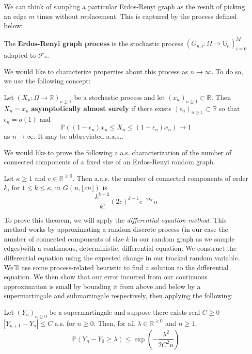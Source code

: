 We can think of sampling a particular Erdos-Renyi graph as the result of picking an edge \(m\) times without replacement. This is captured by the process defined below:
\begin{definition}
    The \textbf{Erdos-Renyi graph process} is the stochastic process \((G_{n, i}: \Omega \to \mathbb{G}_{n})_{i=0}^{M}\) adapted to \(\mathcal{F}_{*}\).
\end{definition}

We would like to characterize properties about this process as \(n \to \infty\). To do so, we use the following concept:
\begin{definition}
     Let \((X_{n}: \Omega \to \mathbb{R})_{n \geq 1}\) be a stochastic process and let \((x_{n})_{n \geq 1}\subset \mathbb{R}\). Then \(X_{n} = x_{n}\) \textbf{asymptotically almost surely} if there exists \((\epsilon_{n})_{n \geq 1} \subset \mathbb{R}\) so that \(\epsilon_{n} = o(1)\) and
    \[\mathbb{P}((1 - \epsilon_{n})x_{n} \leq X_{n} \leq (1 + \epsilon_{n})x_{n}) \to 1\]
    as \(n \to \infty\). It may be abbreviated a.a.s..
\end{definition}

We would like to prove the following a.a.s. characterization of the number of connected components of a fixed size of an Erdos-Renyi random graph.

\begin{theorem}
    Let \(\kappa \geq 1\) and \(c \in \mathbb{R}^{\geq 0}\). Then a.a.s. the number of connected components of order \(k\), for \(1 \leq k \leq \kappa\), in \(G(n, \lfloor cn \rfloor)\) is
    \[\frac{k^{k-2}}{k!}(2c)^{k-1} e^{-2kc}n\]
\end{theorem}

To prove this theorem, we will apply the \textit{differential equation method}. This method works by approximating a random discrete process (in our case the number of connected components of size \(k\) in our random graph as we sample edges)with a continuous, deterministic, differential equation. We construct the differential equation using the expected change in our tracked random variable. We'll use some process-related heuristic to find a solution to the differential equation. We then show that our error incurred from our continuous approximation is small by bounding it from above and below by a supermartingale and submartingale respectively, then applying the following:

\begin{theorem}
    \label{azuma}
    Let \((Y_{n})_{n \geq 0}\) be a supermartingale and suppose there exists real \(C \geq 0\) \(|Y_{n+1} - Y_{n}| \leq C\) a.s. for \(n \geq 0\). Then, for all \(\lambda \in \mathbb{R}^{\geq 0}\) and \(n \geq 1\),
    \[\mathbb{P}(Y_{n} - Y_{0} \geq  \lambda) \leq \exp\left(-\frac{\lambda^{2}}{2C^{2}n}\right)\]
\end{theorem}

